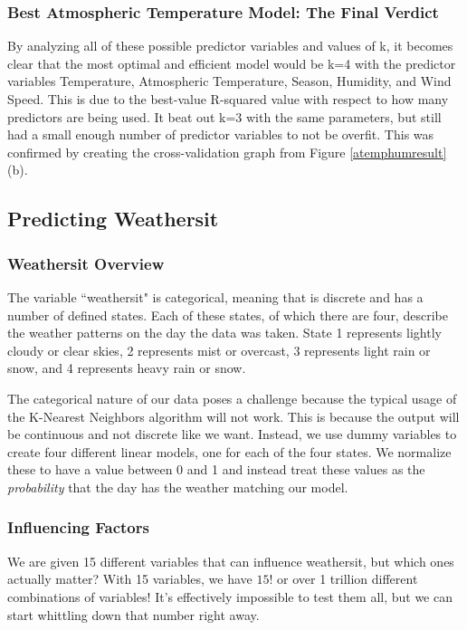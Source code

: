 \documentclass[12pt]{article}
\begin{document}
\subsubsection{Best Atmospheric Temperature Model: The Final Verdict}
By analyzing all of these possible predictor variables and values of k, it becomes clear that the most optimal and efficient model would be k=4 with the predictor variables Temperature, Atmospheric Temperature, Season, Humidity, and Wind Speed. This is due to the best-value R-squared value with respect to how many predictors are being used. It beat out k=3 with the same parameters, but still had a small enough number of predictor variables to not be overfit. This was confirmed by creating the cross-validation graph from Figure \ref{atemphumresult}(b).

\newpage
\subsection{Predicting Weathersit}
\subsubsection{Weathersit Overview}

The variable ``weathersit" is categorical, meaning that is discrete and has a 
number of defined states. Each of these states, of which there are four, describe the weather patterns on the day the data was taken. State 1 represents lightly cloudy or clear skies, 2 represents mist or overcast, 3 represents light rain or snow, and 4 represents heavy rain or snow. 

The categorical nature of our data poses a challenge because the typical usage of the K-Nearest Neighbors algorithm will not work. This is because the output will be continuous and not discrete like we want. Instead, we use dummy variables to create four different linear models, one for each of the four states. We normalize these to have a value between 0 and 1 and instead treat these values as the \textit{probability} that the day has the weather matching our model.

\subsubsection{Influencing Factors}
We are given 15 different variables that can influence weathersit, but which ones actually matter? With 15 variables, we have $15!$ or over 1 trillion different combinations of variables! It's effectively impossible to test them all, but we can start whittling down that number right away.
\end{document}
